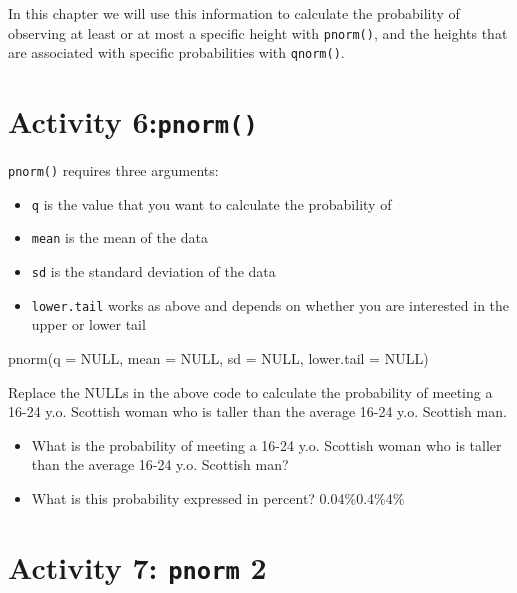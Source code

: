 \documentclass[
  oneside]{book}
\newenvironment{Shaded}{\begin{snugshade}}{\end{snugshade}}
\newcommand{\AttributeTok}[1]{\textcolor[rgb]{0.77,0.63,0.00}{#1}}
\newcommand{\ConstantTok}[1]{\textcolor[rgb]{0.00,0.00,0.00}{#1}}
\newcommand{\FunctionTok}[1]{\textcolor[rgb]{0.00,0.00,0.00}{#1}}
\newcommand{\NormalTok}[1]{#1}
\providecommand{\tightlist}{%
  \setlength{\itemsep}{0pt}\setlength{\parskip}{0pt}}
\begin{document}
In this chapter we will use this information to calculate the probability of observing at least or at most a specific height with \texttt{pnorm()}, and the heights that are associated with specific probabilities with \texttt{qnorm()}.

\hypertarget{activity-6pnorm}{%
\section{\texorpdfstring{Activity 6:\texttt{pnorm()}}{Activity 6:pnorm()}}\label{activity-6pnorm}}

\texttt{pnorm()} requires three arguments:

\begin{itemize}
\tightlist
\item
  \texttt{q} is the value that you want to calculate the probability of
\item
  \texttt{mean} is the mean of the data
\item
  \texttt{sd} is the standard deviation of the data
\item
  \texttt{lower.tail} works as above and depends on whether you are interested in the upper or lower tail
\end{itemize}

\begin{Shaded}
\begin{Highlighting}[]
\FunctionTok{pnorm}\NormalTok{(}\AttributeTok{q =} \ConstantTok{NULL}\NormalTok{, }\AttributeTok{mean =} \ConstantTok{NULL}\NormalTok{, }\AttributeTok{sd =} \ConstantTok{NULL}\NormalTok{, }\AttributeTok{lower.tail =} \ConstantTok{NULL}\NormalTok{)}
\end{Highlighting}
\end{Shaded}

Replace the NULLs in the above code to calculate the probability of meeting a 16-24 y.o. Scottish woman who is taller than the average 16-24 y.o. Scottish man.

\begin{itemize}
\tightlist
\item
  What is the probability of meeting a 16-24 y.o. Scottish woman who is taller than the average 16-24 y.o. Scottish man? \\
\item
  What is this probability expressed in percent? 0.04\%0.4\%4\%
\end{itemize}

\hypertarget{activity-7-pnorm-2}{%
\section{\texorpdfstring{Activity 7: \texttt{pnorm} 2}{Activity 7: pnorm 2}}\label{activity-7-pnorm-2}}
\end{document}
